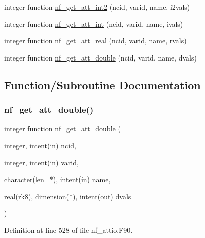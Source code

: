 \begin{DoxyCompactItemize}
integer function \hyperlink{nf__attio_8F90_a0435d47b0fa8d542ab699b1c398a4076}{nf\+\_\+get\+\_\+att\+\_\+int2} (ncid, varid, name, i2vals)
\item 
integer function \hyperlink{nf__attio_8F90_a0133a3c834c93b6e3d07963846c5292c}{nf\+\_\+get\+\_\+att\+\_\+int} (ncid, varid, name, ivals)
\item 
integer function \hyperlink{nf__attio_8F90_acafbf0e38b23214903386ffe3f39ba40}{nf\+\_\+get\+\_\+att\+\_\+real} (ncid, varid, name, rvals)
\item 
integer function \hyperlink{nf__attio_8F90_ace6aec8d763932aac97fcf66195a0123}{nf\+\_\+get\+\_\+att\+\_\+double} (ncid, varid, name, dvals)
\end{DoxyCompactItemize}


\subsection{Function/\+Subroutine Documentation}
\mbox{\label{nf__attio_8F90_ace6aec8d763932aac97fcf66195a0123}} 
\subsubsection{\texorpdfstring{nf\+\_\+get\+\_\+att\+\_\+double()}{nf\_get\_att\_double()}}
{\footnotesize\ttfamily integer function nf\+\_\+get\+\_\+att\+\_\+double (\begin{DoxyParamCaption}\item[{integer, intent(in)}]{ncid,  }\item[{integer, intent(in)}]{varid,  }\item[{character(len=$\ast$), intent(in)}]{name,  }\item[{real(rk8), dimension($\ast$), intent(out)}]{dvals }\end{DoxyParamCaption})}



Definition at line 528 of file nf\+\_\+attio.\+F90.

\mbox{\label{nf__attio_8F90_a0133a3c834c93b6e3d07963846c5292c}} 
